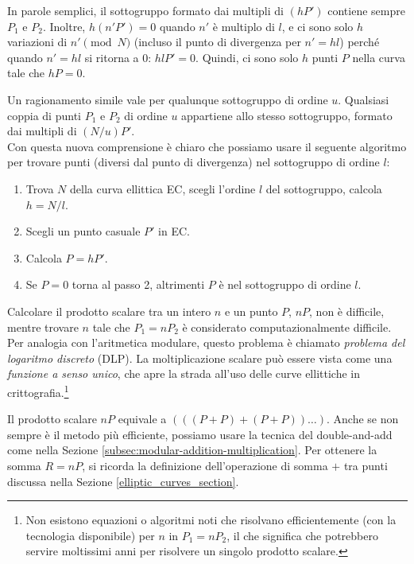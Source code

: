 In parole semplici, il sottogruppo formato dai multipli di \((h P')\) contiene sempre \(P_1\) e \(P_2\). Inoltre, \(h(n' P') = 0\) quando \(n'\) è multiplo di \(l\), e ci sono solo \(h\) variazioni di \(n' \pmod{N}\) (incluso il punto di divergenza per \(n' = h l\)) perché quando \(n' = h l\) si ritorna a 0: \(h l P' = 0\). Quindi, ci sono solo \(h\) punti \(P\) nella curva tale che \(h P = 0\).

Un ragionamento simile vale per qualunque sottogruppo di ordine \(u\). Qualsiasi coppia di punti \(P_1\) e \(P_2\) di ordine \(u\) appartiene allo stesso sottogruppo, formato dai multipli di \((N/u) P'\).
\\ \newline
Con questa nuova comprensione è chiaro che possiamo usare il seguente algoritmo per trovare punti (diversi dal punto di divergenza) nel sottogruppo di ordine \(l\):
\begin{enumerate}
    \item Trova \(N\) della curva ellittica EC, scegli l’ordine \(l\) del sottogruppo, calcola \(h = N / l\).
    \item Scegli un punto casuale \(P'\) in EC.
    \item Calcola \(P = h P'\).
    \item Se \(P = 0\) torna al passo 2, altrimenti \(P\) è nel sottogruppo di ordine \(l\).
\end{enumerate}

Calcolare il prodotto scalare tra un intero \(n\) e un punto \(P\), \(nP\), non è difficile, mentre trovare \(n\) tale che \(P_1 = n P_2\) è considerato computazionalmente difficile. Per analogia con l’aritmetica modulare, questo problema è chiamato {\em problema del logaritmo discreto} (DLP). La moltiplicazione scalare può essere vista come una {\em funzione a senso unico}, che apre la strada all’uso delle curve ellittiche in crittografia.\footnote{Non esistono equazioni o algoritmi noti che risolvano efficientemente (con la tecnologia disponibile) per \(n\) in \(P_1 = n P_2\), il che significa che potrebbero servire moltissimi anni per risolvere un singolo prodotto scalare.}

Il prodotto scalare \(nP\) equivale a \((((P+P)+(P+P)) \ldots )\). Anche se non sempre è il metodo più efficiente, possiamo usare la tecnica del double-and-add come nella Sezione \ref{subsec:modular-addition-multiplication}. Per ottenere la somma \(R = n P\), si ricorda la definizione dell’operazione di somma \(+\) tra punti discussa nella Sezione \ref{elliptic_curves_section}.

